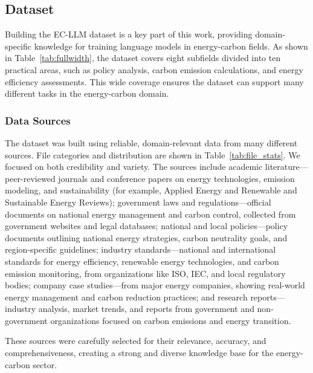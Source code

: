\documentclass[]{interact}
\theoremstyle{plain}%
\theoremstyle{definition}
\theoremstyle{remark}
\begin{document}
\subsection{Dataset}

Building the EC-LLM dataset is a key part of this work, providing domain-specific knowledge for training language models in energy-carbon fields. As shown in Table~\ref{tab:fullwidth}, the dataset covers eight subfields divided into ten practical areas, such as policy analysis, carbon emission calculations, and energy efficiency assessments. This wide coverage ensures the dataset can support many different tasks in the energy-carbon domain.

\subsubsection{Data Sources}

The dataset was built using reliable, domain-relevant data from many different sources. File categories and distribution are shown in Table~\ref{tab:file_stats}. We focused on both credibility and variety. The sources include academic literature—peer-reviewed journals and conference papers on energy technologies, emission modeling, and sustainability (for example, Applied Energy and Renewable and Sustainable Energy Reviews); government laws and regulations—official documents on national energy management and carbon control, collected from government websites and legal databases; national and local policies—policy documents outlining national energy strategies, carbon neutrality goals, and region-specific guidelines; industry standards—national and international standards for energy efficiency, renewable energy technologies, and carbon emission monitoring, from organizations like ISO, IEC, and local regulatory bodies; company case studies—from major energy companies, showing real-world energy management and carbon reduction practices; and research reports—industry analysis, market trends, and reports from government and non-government organizations focused on carbon emissions and energy transition.

These sources were carefully selected for their relevance, accuracy, and comprehensiveness, creating a strong and diverse knowledge base for the energy-carbon sector.
\end{document}
